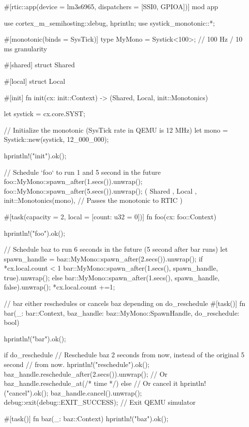 #[rtic::app(device = lm3s6965, dispatchers = [SSI0, GPIOA])]
mod app {
    use cortex_m_semihosting::{debug, hprintln};
    use systick_monotonic::*;

    #[monotonic(binds = SysTick)]
    type MyMono = Systick<100>; // 100 Hz / 10 ms granularity

    #[shared]
    struct Shared {}

    #[local]
    struct Local {}

    #[init]
    fn init(cx: init::Context) -> (Shared, Local, init::Monotonics) {
        let systick = cx.core.SYST;

        // Initialize the monotonic (SysTick rate in QEMU is 12 MHz)
        let mono = Systick::new(systick, 12_000_000);

        hprintln!("init").ok();

        // Schedule `foo` to run 1 and 5 second in the future
        foo::MyMono::spawn_after(1.secs()).unwrap();
        foo::MyMono::spawn_after(5.secs()).unwrap();
        (
            Shared {},
            Local {},
            init::Monotonics(mono), // Passes the monotonic to RTIC
        )
    }

    #[task(capacity = 2, local = [count: u32 = 0])]
    fn foo(cx: foo::Context) {
        hprintln!("foo").ok();

        // Schedule baz to run 6 seconds in the future (5 second after bar runs)
        let spawn_handle = baz::MyMono::spawn_after(2.secs()).unwrap();
        if *cx.local.count < 1{
            bar::MyMono::spawn_after(1.secs(), spawn_handle, true).unwrap();
        } else {
            bar::MyMono::spawn_after(1.secs(), spawn_handle, false).unwrap();
        }
        *cx.local.count +=1;
    }

    // bar either reschedules or cancels baz depending on do_reschedule
    #[task()]
    fn bar(_: bar::Context, baz_handle: baz::MyMono::SpawnHandle, do_reschedule: bool) {
        hprintln!("bar").ok();

        if do_reschedule {
            // Reschedule baz 2 seconds from now, instead of the original 5 second
            // from now.
            hprintln!("reschedule").ok();
            baz_handle.reschedule_after(2.secs()).unwrap();
            // Or baz_handle.reschedule_at(/* time */)
        } else {
            // Or cancel it
            hprintln!("cancel").ok();
            baz_handle.cancel().unwrap();
            debug::exit(debug::EXIT_SUCCESS); // Exit QEMU simulator
        }
    }

    #[task()]
    fn baz(_: baz::Context) {
        hprintln!("baz").ok();
    }

}
